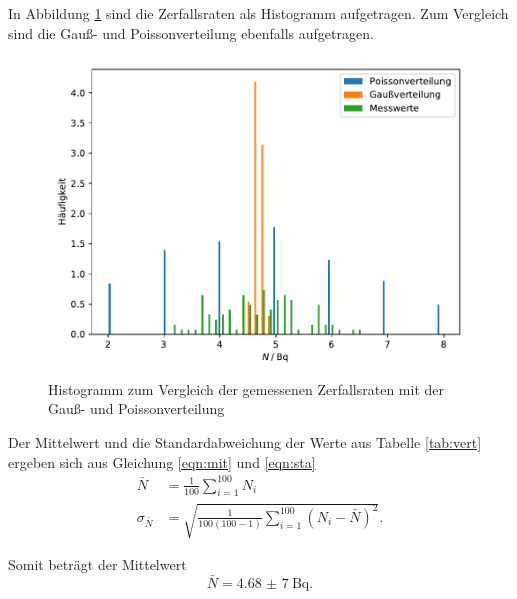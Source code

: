 In Abbildung \ref{fig:vert} sind die Zerfallsraten als Histogramm aufgetragen. Zum Vergleich sind die Gauß- und Poissonverteilung ebenfalls aufgetragen.
\begin{figure}[H]
  \centering
  \includegraphics[width=\textwidth]{Plots/vert.pdf}
  \caption{Histogramm zum Vergleich der gemessenen Zerfallsraten mit der Gauß- und Poissonverteilung}
  \label{fig:vert}
\end{figure}

Der Mittelwert und die Standardabweichung der Werte aus Tabelle \ref{tab:vert} ergeben sich aus Gleichung \eqref{eqn:mit} und \eqref{eqn:sta}
\begin{align}
  \bar{N} &= \frac{1}{100} \sum_{i=1}^{100} N_i
  \label{eqn:mit} \\
  \sigma_{\bar{N}} &= \sqrt{\frac{1}{100 (100 - 1)} \sum_{i=1}^{100} (N_i - \bar{N})^2}.
  \label{eqn:sta}
\end{align}

Somit beträgt der Mittelwert
\begin{equation*}
  \bar{N} = \SI{4,68(7)}{\becquerel}.
\end{equation*}
